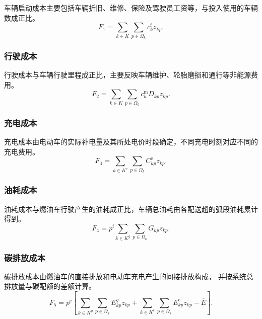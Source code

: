 \documentclass{setp-new}
\begin{document}
车辆启动成本主要包括车辆折旧、维修、保险及驾驶员工资等，与投入使用的车辆数成正比。
\begin{equation}
F_1=\sum_{k\in K}\sum_{p\in\Omega_k}c_k^{\mathrm f}z_{kp}.
\label{eq:unified-f1}
\end{equation}

\subsubsection{行驶成本}

行驶成本与车辆行驶里程成正比，主要反映车辆维护、轮胎磨损和通行等非能源费用。
\begin{equation}
F_2=\sum_{k\in K}\sum_{p\in\Omega_k}c_k^{\mathrm m}D_{kp}z_{kp}.
\label{eq:unified-f2}
\end{equation}

\subsubsection{充电成本}

充电成本由电动车的实际补电量及其所处电价时段确定，不同充电时刻对应不同的充电费用。
\begin{equation}
F_3=\sum_{k\in K^{e}}\sum_{p\in\Omega_k}C_{kp}^{\mathrm e}z_{kp}.
\label{eq:unified-f3}
\end{equation}

\subsubsection{油耗成本}

油耗成本与燃油车行驶产生的油耗成正比，车辆总油耗由各配送趟的弧段油耗累计得到。
\begin{equation}
F_4=p^{\mathrm f}\sum_{k\in K^{g}}\sum_{p\in\Omega_k}G_{kp}z_{kp}.
\label{eq:unified-f4}
\end{equation}

\subsubsection{碳排放成本}

碳排放成本由燃油车的直接排放和电动车充电产生的间接排放构成，
并按系统总排放量与碳配额的差额计算。
\begin{equation}
F_5=p^{\mathrm c}\left[
\sum_{k\in K^{g}}\sum_{p\in\Omega_k}E_{kp}^{g}z_{kp}
+\sum_{k\in K^{e}}\sum_{p\in\Omega_k}E_{kp}^{e}z_{kp}
-\overline E
\right].
\label{eq:unified-f5}
\end{equation}
\end{document}
